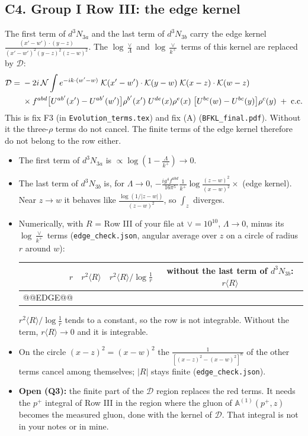 \documentclass[9pt]{article}
\newcommand{\KK}{\mathcal K}
\numberwithin{equation}{section}
\begin{document}
\subsection*{C4. Group I Row III: the edge kernel}
The first term of $d^3N_{3a}$ and the last term of $d^3N_{3b}$ carry the edge kernel $\frac{(x'-w')\cdot(y-z)}{(x'-w')^{2}(y-z)^{2}(z-w)^{2}}$. The $\log\frac{\vee}{\Lambda}$ and $\log\frac{\vee}{k^+}$ terms of this kernel are replaced by $\mathcal D$:
\begin{align*}
\mathcal D={}&-2i\,\mathcal N\int e^{-ik\cdot(w'-w)}\;\KK(x'-w')\cdot\KK(y-w)\;\KK(x-z)\cdot\KK(w-z)\notag\\
&\times f^{abd}\big[U^{ab'}(x')-U^{ab'}(w')\big]\rho^{b'}(x')\;U^{de}(x)\rho^e(x)\;\big[U^{bc}(w)-U^{bc}(y)\big]\rho^c(y)\;+\;{\rm c.c.}
\end{align*}
This is fix F3 (in \texttt{Evolution\_terms.tex}) and fix (A) (\texttt{BFKL\_final.pdf}). Without it the three-$\rho$ terms do not cancel. The finite terms of the edge kernel therefore do not belong to the row either.
\begin{itemize}
\item The first term of $d^3N_{3a}$ is $\propto\log(1-\frac{\Lambda}{k^+})\to0$.
\item The last term of $d^3N_{3b}$ is, for $\Lambda\to0$, $-\frac{ig^4f^{abd}}{16\pi^5}\frac{1}{k^+}\log\frac{(z-w)^2}{(x-w)^2}\times$ (edge kernel). Near $z\to w$ it behaves like $\frac{\log(1/|z-w|)}{(z-w)^2}$, so $\int_z$ diverges.
\item Numerically, with $R$ = Row III of your file at $\vee=10^{10}$, $\Lambda\to0$, minus its $\log\frac{\vee}{k^+}$ terms (\texttt{edge\_check.json}, angular average over $z$ on a circle of radius $r$ around $w$):
\begin{center}\small
\begin{tabular}{@{}rccc@{}}\toprule
$r$ & $r^2\langle R\rangle$ & $r^2\langle R\rangle/\log\frac1r$ & without the last term of $d^3N_{3b}$: $r\langle R\rangle$\\\midrule
@@EDGE@@
\bottomrule
\end{tabular}
\end{center}
$r^2\langle R\rangle/\log\frac1r$ tends to a constant, so the row is not integrable. Without the term, $r\langle R\rangle\to0$ and it is integrable.
\item On the circle $(x-z)^2=(x-w)^2$ the $\frac{1}{[(x-z)^2-(x-w)^2]^n}$ of the other terms cancel among themselves; $|R|$ stays finite (\texttt{edge\_check.json}).
\item \textbf{Open (Q3):} the finite part of the $\mathcal D$ region replaces the red terms. It needs the $p^+$ integral of Row III in the region where the gluon of $\mathbb A^{(1)}(p^+,z)$ becomes the measured gluon, done with the kernel of $\mathcal D$. That integral is not in your notes or in mine.
\end{itemize}
\end{document}
